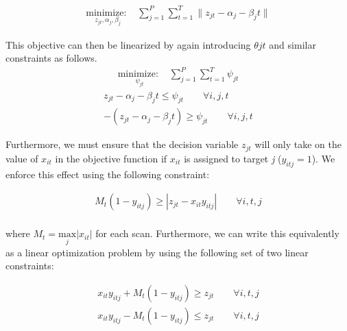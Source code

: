 \begin{align}\label{eq:generalized_objective}
\underset{z_{jt}, \alpha_{j}, \beta_{j}}{\text{minimize: }} & \sum_{j=1}^{P} \sum_{t=1}^{T} \|z_{jt} - \alpha_{j} - \beta_{j}t\|
\end{align}

This objective can then be linearized by again introducing $\theta{jt}$ and similar constraints as follows. 
\begin{align}\label{eq:generalized_linear_objective}
\underset{\psi_{jt}}{\text{minimize: }} & \sum_{j=1}^{P} \sum_{t=1}^{T} \psi_{jt}
\end{align}
\begin{align}
z_{jt} - \alpha_{j} - \beta_{j}t \leq \psi_{jt} \qquad \forall i,j,t\\
-(z_{jt} - \alpha_{j} - \beta_{j}t) \geq \psi_{jt} \qquad \forall i,j,t
\end{align}
 
Furthermore, we must ensure that the decision variable $z_{jt}$ will only take on the value of $x_{it}$ in the objective function if $x_{it}$ is assigned to target \textit{j} ($y_{itj} = 1$). We enforce this effect using the following constraint:

\begin{align}
M_{t}(1-y_{itj}) \geq |z_{jt} - x_{it}y_{itj}| \qquad \forall i,t,j\\
\end{align}

where $M_{t} = \underset{j}{\text{max}}|x_{it}|$ for each scan. Furthermore, we can write this equivalently as a linear optimization problem by using the following set of two linear constraints:

\begin{align}
x_{it}y_{itj} + M_{t}(1-y_{itj}) \geq z_{jt} \qquad \forall i,t,j\\
x_{it}y_{itj} - M_{t}(1-y_{itj}) \leq z_{jt} \qquad \forall i,t,j
\end{align}

